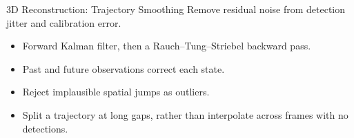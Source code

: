 \begin{frame}{3D Reconstruction: Trajectory Smoothing}
Remove residual noise from detection jitter and calibration error.
\begin{itemize}
  \item Forward Kalman filter, then a Rauch--Tung--Striebel backward pass.
  \item Past and future observations correct each state.
  \item Reject implausible spatial jumps as outliers.
  \item Split a trajectory at long gaps, rather than interpolate across frames with no detections.
\end{itemize}
\end{frame}

